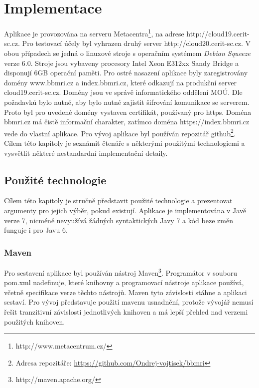 \chapter{Implementace}
Aplikace je provozována na serveru Metacentra\footnote{http://www.metacentrum.cz/}, na adrese http://cloud19.cerit-sc.cz. Pro testovací účely byl vyhrazen druhý server http://cloud20.cerit-sc.cz. V obou případech se jedná o linuxové stroje s operačním systémem \textit{Debian Squeeze} verze 6.0. Stroje jsou vybaveny procesory Intel Xeon E312xx Sandy Bridge a disponují 6GB operační paměti.
Pro ostré nasazení aplikace byly zaregistrovány domény www.bbmri.cz a index.bbmri.cz, které odkazují na produkční server cloud19.cerit-sc.cz. Domény jsou ve správě informatického oddělení MOÚ.
Dle požadavků bylo nutné, aby bylo nutné zajistit šifrování komunikace se serverem. Proto byl pro uvedené domény vystaven certifikát, používaný pro https. 
Doména bbmri.cz má čistě informační charakter, zatímco doména https://index.bbmri.cz vede do vlastní aplikace.
Pro vývoj aplikace byl používán repozitář github\footnote{Adresa repozitáře: \url{https://github.com/Ondrej-vojtisek/bbmri}}. 
Cílem této kapitoly je seznámit čtenáře s některými použitými technologiemi a vysvětlit některé nestandardní implementační detaily.

\section{Použité technologie}
Cílem této kapitoly je stručně představit použité technologie a prezentovat argumenty pro jejich výběr, pokud existují. 
Aplikace je implementována v Javě verze 7, nicméně nevyužívá žádných syntaktických  Javy 7 a kód beze změn funguje i pro Javu 6. 

\subsection{Maven}
Pro sestavení aplikace byl používán nástroj Maven\footnote{http://maven.apache.org/}. Programátor v souboru pom.xml nadefinuje, které knihovny a programovací nástroje aplikace používá, včetně specifikace verze těchto nástrojů. Maven tyto závislosti stáhne a aplikaci sestaví. Pro vývoj představuje použití mavenu usnadnění, protože vývojář nemusí řešit tranzitivní závislosti jednotlivých knihoven a má lepší přehled nad verzemi použitých knihoven. 

